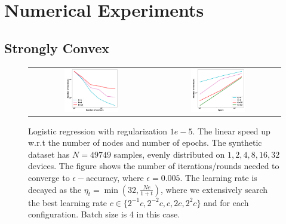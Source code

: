 


\section{Numerical Experiments}
\subsection{Strongly Convex}

\begin{figure}[h!]
\centering
\begin{tabular}{cc}
	\includegraphics[width=0.45\textwidth]{fig/paper-stronglycvxsmthspeedupNodesT-min-w8a-epsilon0131-reg1e-05.pdf} & 
\includegraphics[width=0.45\textwidth]{fig/paper-stronglycvxsmthspeedupEpochsT-min-w8a-epsilon0131-reg1e-05.pdf} \\
\end{tabular}
	\caption{Logistic regression with regularization $1e-5$. The linear speed up w.r.t the number of nodes and number of epochs. The synthetic dataset has $N=49749$ samples, evenly distributed on $1, 2, 4, 8, 16, 32$ devices. The figure shows the number of iterations/rounds needed to converge to $\epsilon-$accuracy, where $\epsilon=0.005$. The learning rate is decayed as the $\eta_t = \min(32, \frac{Nc}{1 + t})$, where we extensively search the best learning rate $c \in \{2^{-1}c, 2^{-2}c, c, 2c, 2^{2}c\}$ and for each configuration. Batch size is 4 in this case.}
\end{figure}



